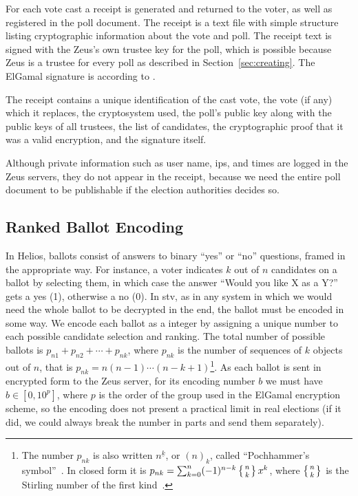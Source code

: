 \documentclass[letterpaper,10pt]{article}
\begin{document}
For each vote cast a receipt is generated and returned to the voter,
as well as registered in the poll document.
The receipt is a text file with simple structure listing cryptographic
information about the vote and poll.
The receipt text is signed with the Zeus's own trustee key for the
poll, which is possible because Zeus is a trustee for every poll
as described in Section~\ref{sec:creating}.
The ElGamal signature is according to \cite{schneier:1995}.

The receipt contains a unique identification of the cast vote,
the vote (if any) which it replaces, the cryptosystem used,
the poll's public key along with the public keys of all trustees,
the list of candidates, the cryptographic proof that it was a valid
encryption, and the signature itself.

Although private information such as user name, {\sc ip}s, and times
are logged in the Zeus servers, they do not appear in the receipt,
because we need the entire poll document to be publishable if
the election authorities decides so.

\subsection{Ranked Ballot Encoding}
\label{sec:ballot_encoding}
In Helios, ballots consist of answers to binary ``yes'' or ``no''
questions, framed in the appropriate way. For instance, a voter
indicates $k$ out of $n$ candidates on a ballot by selecting them, in
which case the answer ``Would you like X as a Y?'' gets a yes (1),
otherwise a no (0). In {\sc stv}, as in any system in which we would need
the whole ballot to be decrypted in the end, the ballot must be
encoded in some way. We encode each ballot as a integer by assigning a
unique number to each possible candidate selection and ranking. The
total number of possible ballots is $p _{n1} + p_{n2} + \cdots + p
_{nk}$, where $p_{nk}$ is the number of sequences of $k$ objects out
of $n$, that is $p_{nk} = n(n - 1)\cdots(n - k + 1)$\footnote{The
  number $p_{nk}$ is also written $n^{\underline{k}}$, or $(n)_k$,
  called ``Pochhammer's symbol''~\cite[p.\ 48]{graham:1994}. In closed
  form it is $p_{nk} = \sum_{k=0}^{n} (-1)^{n-k}\left\{n \atop
    k\right\}x^k$, where $\left\{n \atop k\right\}$ is the Stirling
  number of the first kind~\cite{weisstein:pochhammer}.}. As each
ballot is sent in encrypted form to the Zeus server, for its encoding
number $b$ we must have $b \in [0, 10^p]$, where $p$ is the order of
the group used in the ElGamal encryption scheme, so the encoding does
not present a practical limit in real elections (if it did, we could
always break the number in parts and send them separately).
\end{document}
